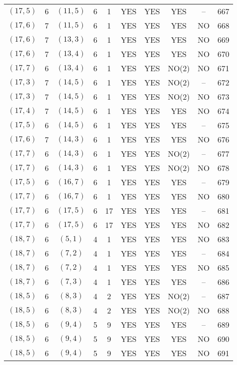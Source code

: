 \begin{longtable}{|c|c|c|c|c|c|c|c|c|c|}
$(17, 5)$ & 6 & $(11, 5)$ & 6 & 1 & YES & YES & YES & -- & 667\\
$(17, 6)$ & 7 & $(11, 5)$ & 6 & 1 & YES & YES & YES & NO & 668\\
$(17, 6)$ & 7 & $(13, 3)$ & 6 & 1 & YES & YES & YES & NO & 669\\
$(17, 6)$ & 7 & $(13, 4)$ & 6 & 1 & YES & YES & YES & NO & 670\\
$(17, 7)$ & 6 & $(13, 4)$ & 6 & 1 & YES & YES & NO(2) & NO & 671\\
$(17, 3)$ & 7 & $(14, 5)$ & 6 & 1 & YES & YES & NO(2) & -- & 672\\
$(17, 3)$ & 7 & $(14, 5)$ & 6 & 1 & YES & YES & NO(2) & NO & 673\\
$(17, 4)$ & 7 & $(14, 5)$ & 6 & 1 & YES & YES & YES & NO & 674\\
$(17, 5)$ & 6 & $(14, 5)$ & 6 & 1 & YES & YES & YES & -- & 675\\
$(17, 6)$ & 7 & $(14, 3)$ & 6 & 1 & YES & YES & YES & NO & 676\\
$(17, 7)$ & 6 & $(14, 3)$ & 6 & 1 & YES & YES & NO(2) & -- & 677\\
$(17, 7)$ & 6 & $(14, 3)$ & 6 & 1 & YES & YES & NO(2) & NO & 678\\
$(17, 5)$ & 6 & $(16, 7)$ & 6 & 1 & YES & YES & YES & -- & 679\\
$(17, 7)$ & 6 & $(16, 7)$ & 6 & 1 & YES & YES & YES & NO & 680\\
$(17, 7)$ & 6 & $(17, 5)$ & 6 & 17 & YES & YES & YES & -- & 681\\
$(17, 7)$ & 6 & $(17, 5)$ & 6 & 17 & YES & YES & YES & NO & 682\\
$(18, 7)$ & 6 & $(5, 1)$ & 4 & 1 & YES & YES & YES & NO & 683\\
$(18, 7)$ & 6 & $(7, 2)$ & 4 & 1 & YES & YES & YES & -- & 684\\
$(18, 7)$ & 6 & $(7, 2)$ & 4 & 1 & YES & YES & YES & NO & 685\\
$(18, 7)$ & 6 & $(7, 3)$ & 4 & 1 & YES & YES & YES & -- & 686\\
$(18, 5)$ & 6 & $(8, 3)$ & 4 & 2 & YES & YES & NO(2) & -- & 687\\
$(18, 5)$ & 6 & $(8, 3)$ & 4 & 2 & YES & YES & NO(2) & NO & 688\\
$(18, 5)$ & 6 & $(9, 4)$ & 5 & 9 & YES & YES & YES & -- & 689\\
$(18, 5)$ & 6 & $(9, 4)$ & 5 & 9 & YES & YES & YES & NO & 690\\
$(18, 5)$ & 6 & $(9, 4)$ & 5 & 9 & YES & YES & YES & NO & 691\\

\end{longtable}
